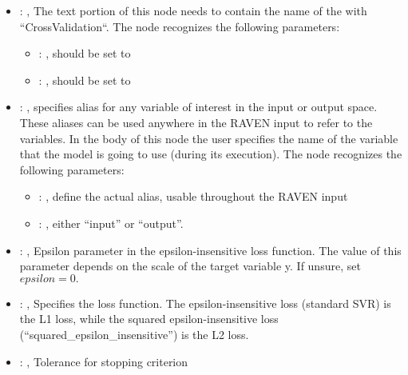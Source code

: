 \begin{itemize}
    \item {}: , 
      The text portion of this node needs to contain the name of the  with
               ``CrossValidation``.
      The  node recognizes the following parameters:
        \begin{itemize}
          \item {}: , 
            should be set to 
          \item {}: , 
            should be set to 
      \end{itemize}

    \item {}: , 
      specifies alias for         any variable of interest in the input or output space. These
      aliases can be used anywhere in the RAVEN input to         refer to the variables. In the body
      of this node the user specifies the name of the variable that the model is going to use
      (during its execution).
      The  node recognizes the following parameters:
        \begin{itemize}
          \item {}: , 
            define the actual alias, usable throughout the RAVEN input
          \item {}: , 
            either ``input'' or ``output''.
      \end{itemize}

    \item {}: , 
      Epsilon parameter in the epsilon-insensitive loss function. The value of
      this parameter depends on the scale of the target variable y. If unsure, set $epsilon=0.$

    \item {}: , 
      Specifies the loss function. The epsilon-insensitive loss (standard SVR)
      is the L1 loss, while the squared epsilon-insensitive loss (``squared\_epsilon\_insensitive'')
      is the L2 loss.

    \item {}: , 
      Tolerance for stopping criterion


\end{itemize}
